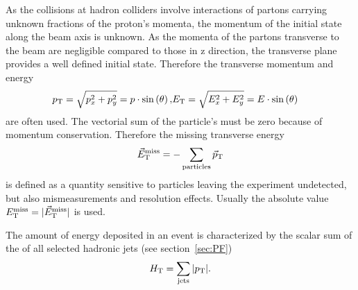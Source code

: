 As the collisions at hadron colliders involve interactions of partons carrying unknown fractions of the proton's momenta, the momentum of the initial state along the beam axis is unknown. As the momenta of the partons transverse to the beam are negligible compared to those in z direction, the transverse plane provides a well defined initial state. Therefore the transverse momentum and energy
\begin{eqnarray}
p_{\mathrm{T}} = \sqrt{p_x^2  + p_y^2} = p\cdot \sin\left(\theta\right), & E_{\mathrm{T}} = \sqrt{E_x^2  + E_y^2} = E\cdot \sin\left(\theta\right)
\end{eqnarray}
are often used. The vectorial sum of the particle's \pt must be zero because of momentum conservation. Therefore the missing transverse energy 
\begin{equation}
\vec{E}_{\mathrm{T}}^{\mathrm{miss}} = - \sum\limits_{\text{particles}} \vec{p}_{\mathrm{T}}
\end{equation}
is defined as a quantity sensitive to particles leaving the experiment undetected, but also mismeasurements and resolution effects. Usually the absolute value $E_{\mathrm{T}}^{\mathrm{miss}} = \vert \vec{E}_{\mathrm{T}}^{\mathrm{miss}} \vert$ is used.

The amount of energy deposited in an event is characterized by the scalar sum of the \pt of all selected hadronic jets (see section~\ref{sec:PF}) 
\begin{equation}
H_\mathrm{T} = \sum\limits_{\text{jets}} \vert p_{\mathrm{T}} \vert.
\end{equation}

